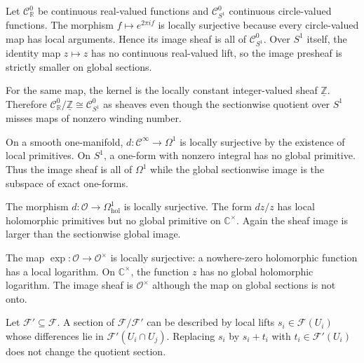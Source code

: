 \begin{example}
Let $\mathcal C^0_{\mathbb R}$ be continuous real-valued functions and $\mathcal C^0_{S^1}$ continuous circle-valued functions. The morphism $f\mapsto e^{2\pi i f}$ is locally surjective because every circle-valued map has local arguments. Hence its image sheaf is all of $\mathcal C^0_{S^1}$. Over $S^1$ itself, the identity map $z\mapsto z$ has no continuous real-valued lift, so the image presheaf is strictly smaller on global sections.
\end{example}

\begin{example}
For the same map, the kernel is the locally constant integer-valued sheaf $\underline{\mathbb Z}$. Therefore $\mathcal C^0_{\mathbb R}/\underline{\mathbb Z}\cong\mathcal C^0_{S^1}$ as sheaves even though the sectionwise quotient over $S^1$ misses maps of nonzero winding number.
\end{example}

\begin{example}
On a smooth one-manifold, $d:\mathcal C^\infty\to\Omega^1$ is locally surjective by the existence of local primitives. On $S^1$, a one-form with nonzero integral has no global primitive. Thus the image sheaf is all of $\Omega^1$ while the global sectionwise image is the subspace of exact one-forms.
\end{example}

\begin{example}
The morphism $d:\mathcal O\to\Omega^1_{\mathrm{hol}}$ is locally surjective. The form $dz/z$ has local holomorphic primitives but no global primitive on $\mathbb C^\times$. Again the sheaf image is larger than the sectionwise global image.
\end{example}

\begin{example}
The map $\exp:\mathcal O\to\mathcal O^\times$ is locally surjective: a nowhere-zero holomorphic function has a local logarithm. On $\mathbb C^\times$, the function $z$ has no global holomorphic logarithm. The image sheaf is $\mathcal O^\times$ although the map on global sections is not onto.
\end{example}

\begin{example}
Let $\mathcal F'\subseteq\mathcal F$. A section of $\mathcal F/\mathcal F'$ can be described by local lifts $s_i\in\mathcal F(U_i)$ whose differences lie in $\mathcal F'(U_i\cap U_j)$. Replacing $s_i$ by $s_i+t_i$ with $t_i\in\mathcal F'(U_i)$ does not change the quotient section.
\end{example}

